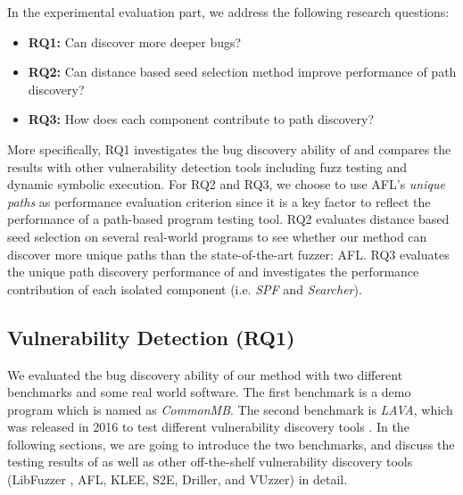 In the experimental evaluation part, we address the following 
research questions:
\begin{itemize}
\setlength{\itemsep}{0pt}
\item {\textbf{RQ1:} Can \prototype discover more deeper bugs?}
\item {\textbf{RQ2:} Can distance based seed selection method 
	improve performance of path discovery?}
\item {\textbf{RQ3:} How does each component contribute to 
	path discovery?}
\end{itemize}

More specifically, RQ1 investigates the bug discovery ability of 
\prototype and compares the results with other vulnerability 
detection tools including fuzz testing and dynamic symbolic execution. 
For RQ2 and RQ3, we choose to use AFL's \textit{unique paths} as performance evaluation criterion since it is a key factor to reflect the 
performance of a path-based program testing tool.
RQ2 evaluates distance based seed selection on several 
real-world programs to see whether our method can discover more 
unique paths than the state-of-the-art fuzzer: AFL. RQ3 evaluates 
the unique path discovery performance of \prototype and 
investigates the performance contribution of each isolated 
component (i.e. \textit{SPF} and \textit{Searcher}).


\subsection{Vulnerability Detection (RQ1)}
We evaluated the bug discovery ability of our method with two 
different benchmarks and some real world software. The first 
benchmark is a demo program which is named as \emph{CommonMB}. 
The second benchmark is \emph{LAVA}, which was released in 2016 
to test different vulnerability discovery tools \cite{dolan2016lava}. 
In the following sections, we are going to introduce the 
two benchmarks, and discuss the testing results of \prototype
as well as other off-the-shelf vulnerability discovery tools 
(LibFuzzer \cite{libfuzzer}, AFL, KLEE, S2E, Driller, and VUzzer) in detail.

